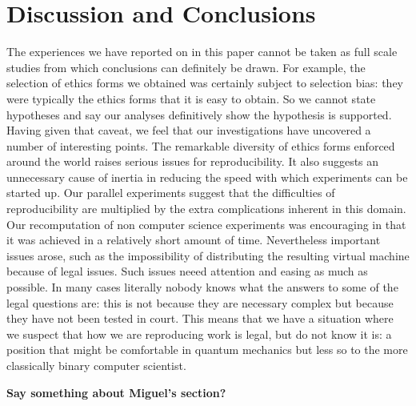 \section{Discussion and Conclusions}
\label{s:discussion}

The experiences we have reported on in this paper cannot be taken as full scale studies from which conclusions can definitely be drawn.  For example, the 
selection of ethics forms we obtained was certainly subject to selection bias: they were typically the ethics forms that it is easy to obtain.  So we cannot state hypotheses and say our analyses definitively show the hypothesis is supported.   Having given that caveat, we feel that our investigations have uncovered a number of interesting points.  The remarkable diversity of ethics forms enforced around the world raises serious issues for reproducibility.  It also suggests an unnecessary cause of inertia in reducing the speed with which experiments can be started up.  Our parallel experiments suggest that the difficulties of reproducibility are 
multiplied by the extra complications inherent in this domain.  Our recomputation of non computer science experiments was encouraging in that it was achieved in a relatively short amount of time. Nevertheless important issues arose, such as the impossibility of distributing the resulting virtual machine because of legal issues. 
Such issues neeed attention and easing as much as possible.  In many cases literally nobody knows what the answers to some of the legal questions are: this is not because they are necessary complex but because they have not been tested in court.  This means that we have a situation where we suspect that how we are reproducing work is legal, but do not know it is: a position that might be comfortable in quantum mechanics but less so to the more classically binary computer scientist. 

\textbf{Say something about Miguel's section?}


